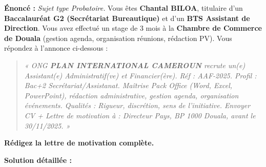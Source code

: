 \documentclass[11pt]{article}
\begin{document}
\begin{exoresolu}
    \textbf{Énoncé :} \textit{Sujet type Probatoire.} Vous êtes \textbf{Chantal BILOA}, titulaire d'un \textbf{Baccalauréat G2 (Secrétariat Bureautique)} et d'un \textbf{BTS Assistant de Direction}. Vous avez effectué un stage de 3 mois à la \textbf{Chambre de Commerce de Douala} (gestion agenda, organisation réunions, rédaction PV). Vous répondez à l'annonce ci-dessous :

    \begin{quote}
    \textit{« ONG \textbf{PLAN INTERNATIONAL CAMEROUN} recrute un(e) Assistant(e) Administratif(ve) et Financier(ère). Réf : AAF-2025. Profil : Bac+2 Secrétariat/Assistanat. Maîtrise Pack Office (Word, Excel, PowerPoint), rédaction administrative, gestion agenda, organisation événements. Qualités : Rigueur, discrétion, sens de l'initiative. Envoyer CV + Lettre de motivation à : Directeur Pays, BP 1000 Douala, avant le 30/11/2025. »}
    \end{quote}
    \textbf{Rédigez la lettre de motivation complète.}

    \tcblower
    \textbf{Solution détaillée :}


\end{exoresolu}
\end{document}
